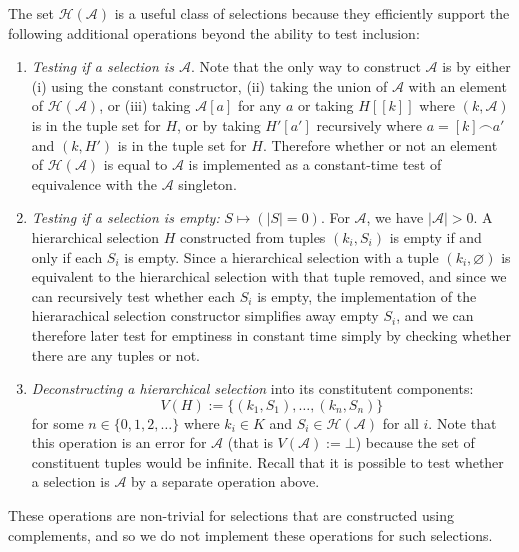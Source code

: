 \documentclass{article}
\begin{document}
The set $\mathcal{H}(\mathcal{A})$ is a useful class of selections because they efficiently support
the following additional operations beyond the ability to test inclusion:
\begin{enumerate}
\item \emph{Testing if a selection is $\mathcal{A}$}.
Note that the only way to construct $\mathcal{A}$ is by either
(i) using the constant constructor,
(ii) taking the union of $\mathcal{A}$ with an element of $\mathcal{H}(\mathcal{A})$, or
(iii) taking $\mathcal{A}[a]$ for any $a$ or taking $H[[k]]$ where $(k, \mathcal{A})$ is in the tuple set for $H$, or by taking $H'[a']$ recursively where $a = [k] \frown a'$ and $(k, H')$ is in the tuple set for $H$.
Therefore whether or not an element of $\mathcal{H}(\mathcal{A})$ is equal to $\mathcal{A}$ is implemented as a constant-time test of equivalence with the $\mathcal{A}$ singleton.
\item \emph{Testing if a selection is empty:}
$S \mapsto (|S| = 0)$.
For $\mathcal{A}$, we have $|\mathcal{A}| > 0$.
A hierarchical selection $H$ constructed from tuples $(k_i, S_i)$ is empty if and only if 
each $S_i$ is empty.
Since a hierarchical selection with a tuple $(k_i, \varnothing)$ is equivalent to the hierarchical selection with that tuple removed,
and since we can recursively test whether each $S_i$ is empty, the implementation of the hierarachical selection constructor simplifies away empty $S_i$, and
we can therefore later test for emptiness in constant time simply by checking whether there are any tuples or not.
\item
\emph{Deconstructing a hierarchical selection} into its constitutent components:
\[
V(H) := \{(k_1, S_1), \ldots, (k_n, S_n)\}
\]
for some $n \in \{0, 1, 2, \ldots\}$
where $k_i \in K$ and $S_i \in \mathcal{H}(\mathcal{A})$ for all $i$.
Note that this operation is an error for $\mathcal{A}$ (that is $V(\mathcal{A}) := \bot$) because the set of constituent tuples would be infinite.
Recall that it is possible to test whether a selection is $\mathcal{A}$ by a separate operation above.
\end{enumerate}
These operations are non-trivial for selections that are constructed using complements,
and so we do not implement these operations for such selections.



 
\end{document}
